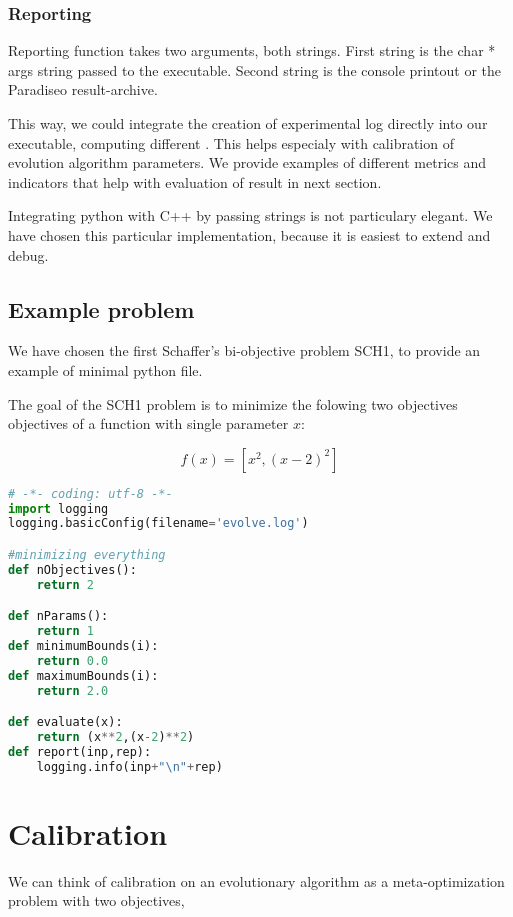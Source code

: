 \documentclass[12pt,oneside]{fithesis2}
\begin{document}
\subsection{Reporting}

Reporting function takes two arguments, both strings. First string is the char * args string passed to the executable. Second string is the console printout or the Paradiseo result-archive.

This way, we could integrate the creation of experimental log directly into our executable, computing different . This helps especialy with calibration of evolution algorithm parameters.
We provide examples of different metrics and indicators that help with evaluation of result in next section.

Integrating python with C++ by passing strings is not particulary elegant. We have chosen this particular implementation, because it is easiest to extend and debug.

\section{Example problem}

We have chosen the first Schaffer's bi-objective problem SCH1, to provide an example of minimal python file.

The goal of the SCH1 problem is to minimize the folowing two objectives objectives of a function with single parameter $x$:

$$f(x) = [x^2,(x-2)^2]$$

\begin{lstlisting}[language=Python,label=min_example,caption=Minimal working example]
# -*- coding: utf-8 -*-
import logging
logging.basicConfig(filename='evolve.log')

#minimizing everything 
def nObjectives():
	return 2

def nParams():
	return 1
def minimumBounds(i):
	return 0.0
def maximumBounds(i):
	return 2.0

def evaluate(x):
	return (x**2,(x-2)**2)
def report(inp,rep):
	logging.info(inp+"\n"+rep) 
\end{lstlisting}

\chapter{Calibration}
\label{chap:calib}
We can think of calibration on an evolutionary algorithm as a meta-optimization problem with two objectives, 
\end{document}
